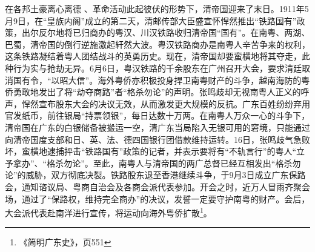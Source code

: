 在各邦土豪离心离德 、革命活动此起彼伏的形势下，清帝国迎来了末日。1911年5月9日，在“皇族内阁”成立的第二天，清邮传部大臣盛宣怀悍然推出“铁路国有”政策，出尔反尔地将已归商办的粤汉、川汉铁路收归清帝国“国有”。在南粤、两湖、巴蜀，清帝国的倒行逆施激起轩然大波。粤汉铁路商办是南粤人辛苦争来的权利，这条铁路凝结着粤人团结战斗的英勇历史。现在，清帝国却要蛮横地将其夺走，此种行为实与抢劫无异。6月6日，粤汉铁路的千余股东在广州召开大会，要求清廷取消国有令，“以昭大信”。海外粤侨亦积极投身捍卫南粤财产的斗争，越南海防的粤侨勇敢地发出了将“劫夺商路”者“格杀勿论”的声明。张鸣歧却无视南粤人正义的呼声，悍然宣布股东大会的决议无效，从而激发更大规模的反抗。广东百姓纷纷弃用官发纸币，前往银局“持票领银”，每日达数十万两。在南粤人万众一心的斗争下，清帝国在广东的白银储备被搬运一空，清广东当局陷入无银可用的窘境，只能通过向清帝国度支部和日、英、法、德四国银行团借款维持运转。16日，张鸣歧气急败坏，蛮横地逮捕抨击“铁路国有”政策的记者，并表示要将有“不轨言行”的粤人“立予拿办”、“格杀勿论”。至此，南粤人与清帝国的两广总督已经互相发出“格杀勿论”的威胁，双方彻底决裂。铁路股东退至香港继续斗争，于9月3日成立广东保路会，通知谘议局、粤商自治会及各商会派代表参加。开会之时，近万人冒雨齐聚会场，通过了“保路权，维持完全商办”的决议，发誓一定要守护南粤的财产。会后，大会派代表赴南洋进行宣传，将运动向海外粤侨扩散\footnote{《简明广东史》，页551}。

